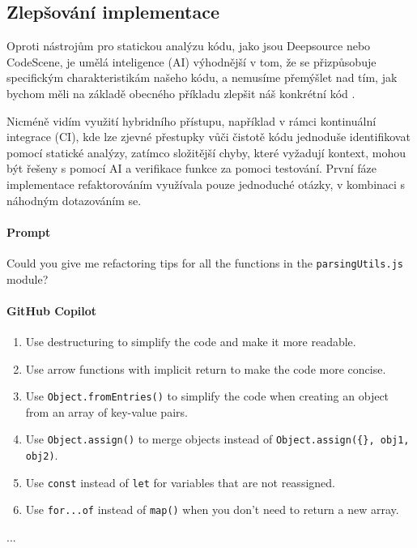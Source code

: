 \documentclass[FM,DP]{tulthesis}
\begin{document}
		\subsection{Zlepšování implementace}
		Oproti nástrojům pro statickou analýzu kódu, jako jsou Deepsource nebo CodeScene, je umělá inteligence (AI) výhodnější v tom, že se přizpůsobuje specifickým charakteristikám našeho kódu, a nemusíme přemýšlet nad tím, jak bychom měli na základě obecného příkladu zlepšit náš konkrétní kód \cite{deepsource} \cite{codescene}.
		
		Nicméně vidím využití hybridního přístupu, například v rámci kontinuální integrace (CI), kde lze zjevné přestupky vůči čistotě kódu jednoduše identifikovat pomocí statické analýzy, zatímco složitější chyby, které vyžadují kontext, mohou být řešeny s pomocí AI a verifikace funkce za pomoci testování. První fáze implementace refaktorováním využívala pouze jednoduché otázky, v kombinaci s náhodným dotazováním se.
		\vspace{0.6em}
		\begin{tcolorbox}[colback=white,colframe=black]
			\paragraph{Prompt}
			Could you give me refactoring tips for all the functions in the \verb|parsingUtils.js| module?
			
			\vspace{0.6em}
			
			\paragraph{GitHub Copilot}
			\begin{enumerate}
				\item Use destructuring to simplify the code and make it more readable.
				\item Use arrow functions with implicit return to make the code more concise.
				\item Use \verb|Object.fromEntries()| to simplify the code when creating an object from an array of key-value pairs.
				\item Use \verb|Object.assign()| to merge objects instead of \verb|Object.assign({}, obj1, obj2)|.
				\item Use \verb|const| instead of \verb|let| for variables that are not reassigned.
				\item Use \verb|for...of| instead of \verb|map()| when you don't need to return a new array.
			\end{enumerate}
			... \cite{refactoring_simple}
		\end{tcolorbox} 
		
\end{document}
